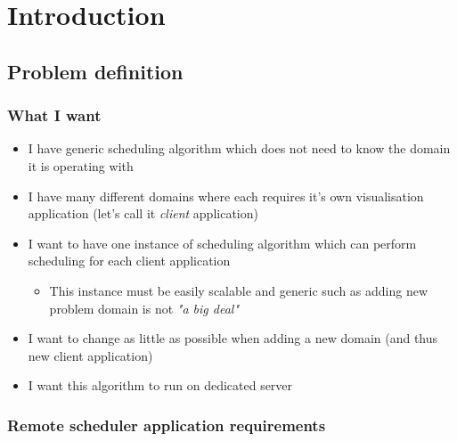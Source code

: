 
\chapter{Introduction}\label{ch:introduction}

\section{Problem definition}\label{sec:problem-definition}

\subsection{What I want}\label{subsec:what-i-want}

\begin{itemize}
    \item I have generic scheduling algorithm which does not need to know the domain it is operating with
    \item I have many different domains where each requires it's own visualisation application (let's call it \textit{client} application)
    \item I want to have one instance of scheduling algorithm which can perform scheduling for each client application
    \begin{itemize}
        \item This instance must be easily scalable and generic such as adding new problem domain is not \textit{"a big deal"}
    \end{itemize}
    \item I want to change as little as possible when adding a new domain (and thus new client application)
    \item I want this algorithm to run on dedicated server
\end{itemize}

\subsection{Remote scheduler application requirements}\label{subsec:remote-scheduler-application-requirements}

